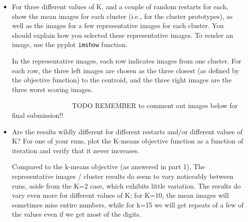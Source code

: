 \documentclass[submit]{harvardml}
\newenvironment{answer}{%
\color{answergreen}\sffamily\large}{}
\begin{document}
\begin{itemize}
\begin{answer}
\end{answer}

\item For three different values of K, and a couple of random restarts for each, show the mean
    images for each cluster (i.e., for the cluster prototypes), as well as the images for a few
    representative images for each cluster. You should explain how you selected these representative
    images. To render an image, use the pyplot \texttt{imshow} function. 

\begin{answer}

In the representative images, each row indicates images from one cluster.
For each row, the three left images are chosen as the three closest (as defined
by the objective function) to the centroid, and the three right images are the three worst scoring images.

~~~~~~~~~~~~~~~~~ TODO REMEMBER to comment out images below for final submission!!


\end{answer}


\item Are the results wildly different for different
restarts and/or different 
values of K?
For one of your runs, plot the K-means objective function as a function of iteration and verify that
it never increases.

\begin{answer}
        Compared to the k-means objective (as answered in part 1), The representative images /
        cluster results do seem to vary noticeably between runs, aside from the K=2 case, which
        exhibits little variation.  The results do vary even more for different values of K; for
        K=10, the mean images will sometimes miss entire numbers, while for k=15 we will get repeats
        of a few of the values
        even if we get most of the digits. 


\end{answer}
\end{itemize}
\end{document}
